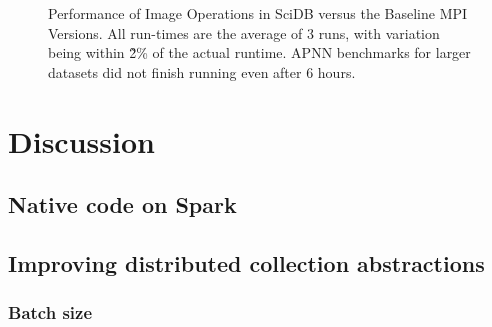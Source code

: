 \documentclass[tog]{acmsiggraph}
\begin{document}
\begin{figure}[htp] \centering
{}
\hspace{1 em}
	\caption{Performance of Image Operations in SciDB versus the Baseline MPI
Versions. All run-times are the average of 3 runs, with variation being within
\~2\% of the actual runtime. APNN benchmarks for larger datasets did not finish
running even after 6 hours.}
	\label{fig:breakdown}
\end{figure}

\section{Discussion}

\subsection{Native code on Spark}

\subsection{Improving distributed collection abstractions}

\subsubsection{Batch size}
\end{document}
